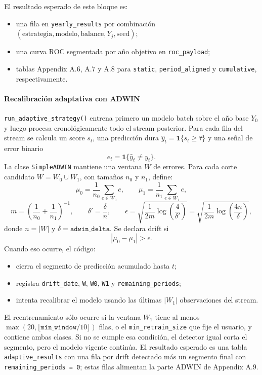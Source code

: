 El resultado esperado de este bloque es:
\begin{itemize}[leftmargin=*]
  \item una fila en \texttt{yearly\_results} por combinaci\'on \((\text{estrategia}, \text{modelo}, \text{balance}, Y_j, \text{seed})\);
  \item una curva ROC segmentada por a\~no objetivo en \texttt{roc\_payload};
  \item tablas Appendix A.6, A.7 y A.8 para \texttt{static}, \texttt{period\_aligned} y \texttt{cumulative}, respectivamente.
\end{itemize}

\paragraph{Recalibraci\'on adaptativa con ADWIN}
\texttt{run\_adaptive\_strategy()} entrena primero un modelo batch sobre el a\~no base \(Y_0\) y luego procesa cronol\'ogicamente todo el stream posterior. Para cada fila del stream se calcula un score \(s_t\), una predicci\'on dura \(\hat{y}_t = \mathbf{1}\{s_t \ge \hat{\tau}\}\) y una se\~nal de error binario
\[
e_t = \mathbf{1}\{\hat{y}_t \neq y_t\}.
\]
La clase \texttt{SimpleADWIN} mantiene una ventana \(W\) de errores. Para cada corte candidato \(W = W_0 \cup W_1\), con tama\~nos \(n_0\) y \(n_1\), define:
\[
\mu_0 = \frac{1}{n_0}\sum_{e \in W_0} e,
\qquad
\mu_1 = \frac{1}{n_1}\sum_{e \in W_1} e,
\]
\[
m = \left(\frac{1}{n_0} + \frac{1}{n_1}\right)^{-1},
\qquad
\delta' = \frac{\delta}{n},
\qquad
\epsilon = \sqrt{\frac{1}{2m}\log\left(\frac{4}{\delta'}\right)}
= \sqrt{\frac{1}{2m}\log\left(\frac{4n}{\delta}\right)},
\]
donde \(n = |W|\) y \(\delta = \texttt{adwin\_delta}\). Se declara drift si
\[
|\mu_0 - \mu_1| > \epsilon.
\]
Cuando eso ocurre, el c\'odigo:
\begin{itemize}[leftmargin=*]
  \item cierra el segmento de predicci\'on acumulado hasta \(t\);
  \item registra \texttt{drift\_date}, \texttt{W}, \texttt{W0}, \texttt{W1} y \texttt{remaining\_periods};
  \item intenta recalibrar el modelo usando las \'ultimas \(|W_1|\) observaciones del stream.
\end{itemize}
El reentrenamiento s\'olo ocurre si la ventana \(W_1\) tiene al menos \(\max(20, \lfloor \texttt{min\_window}/10 \rfloor)\) filas, o el \texttt{min\_retrain\_size} que fije el usuario, y contiene ambas clases. Si no se cumple esa condici\'on, el detector igual corta el segmento, pero el modelo vigente contin\'ua. El resultado esperado es una tabla \texttt{adaptive\_results} con una fila por drift detectado m\'as un segmento final con \texttt{remaining\_periods = 0}; estas filas alimentan la parte ADWIN de Appendix A.9.

